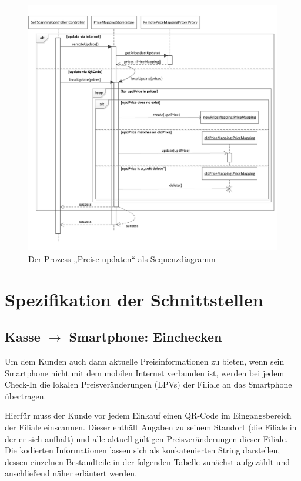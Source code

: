 \begin{figure}[H]
\includegraphics[width=\linewidth]{res/seq_preise-updaten.pdf}
\caption{Der Prozess „Preise updaten“ als Sequenzdiagramm}
\end{figure}

\section{Spezifikation der Schnittstellen}
\subsection{Kasse $\rightarrow$ Smartphone: Einchecken}\label{interface-einchecken}
Um dem Kunden auch dann aktuelle Preisinformationen zu bieten, wenn sein Smartphone nicht mit dem mobilen Internet verbunden ist, werden bei jedem Check-In die lokalen Preisveränderungen (LPVs) der Filiale an das Smartphone übertragen.

Hierfür muss der Kunde vor jedem Einkauf einen QR-Code im Eingangsbereich der Filiale einscannen. Dieser enthält Angaben zu seinem Standort (die Filiale in der er sich aufhält) und alle aktuell gültigen Preisveränderungen dieser Filiale. Die kodierten Informationen lassen sich als konkatenierten String darstellen, dessen einzelnen Bestandteile in der folgenden Tabelle zunächst aufgezählt und anschließend näher erläutert werden.

